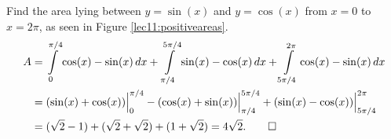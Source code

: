 \begin{example}
	Find the area lying between $y = \sin(x)$ and $y = \cos(x)$ from $x = 0$ to $x = 2 \pi$, as seen in Figure \ref{lec11:positiveareas}.
	\begin{align*}
		A & = \int\limits_0^{\pi/4} \cos(x) - \sin(x) \, d x + \int\limits_{\pi/4}^{5 \pi/4} \sin(x) - \cos(x) \, d x + \int\limits_{5 \pi/4}^{2\pi} \cos(x) - \sin(x) \, d x \\
		  & = (\sin(x) + \cos(x)) \Big \rvert_0^{\pi/4} - (\cos(x) + \sin(x)) \Big \rvert_{\pi/4}^{5 \pi/4} + (\sin(x) - \cos(x)) \Big \rvert_{5\pi/4}^{2\pi}                 \\
		  & = (\sqrt{2} - 1) + (\sqrt{2} + \sqrt{2}) + (1 + \sqrt{2}) = 4 \sqrt{2}. \qedhere
	\end{align*}
\end{example}
